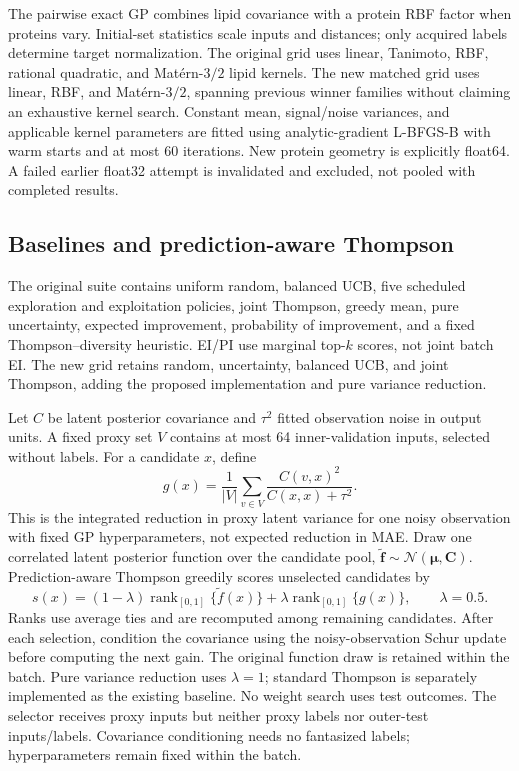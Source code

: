 \documentclass[wcp]{jmlr}
\begin{document}
The pairwise exact GP combines lipid covariance with a protein RBF factor
when proteins vary. Initial-set statistics scale inputs and distances;
only acquired labels determine target normalization. The original grid uses
linear, Tanimoto, RBF, rational quadratic, and Mat\'ern-$3/2$ lipid kernels.
The new matched grid uses linear, RBF, and Mat\'ern-$3/2$, spanning previous
winner families without claiming an exhaustive kernel search. Constant mean,
signal/noise variances, and applicable kernel parameters are fitted using
analytic-gradient L-BFGS-B with warm starts and at most 60 iterations.
New protein geometry is explicitly float64. A failed earlier float32 attempt
is invalidated and excluded, not pooled with completed results.

\subsection{Baselines and prediction-aware Thompson}
The original suite contains uniform random, balanced UCB, five scheduled
exploration and exploitation policies, joint Thompson, greedy mean, pure
uncertainty, expected improvement, probability of improvement, and a fixed
Thompson--diversity heuristic. EI/PI use marginal top-$k$ scores, not joint
batch EI. The new grid retains random, uncertainty, balanced UCB, and joint
Thompson, adding the proposed implementation and pure variance reduction.

Let $C$ be latent posterior covariance and $\tau^2$ fitted observation noise
in output units. A fixed proxy set $V$ contains at most 64 inner-validation
inputs, selected without labels. For a candidate $x$, define
\begin{equation}
g(x)=\frac{1}{|V|}\sum_{v\in V}
\frac{C(v,x)^2}{C(x,x)+\tau^2}.
\label{eq:gain}
\end{equation}
This is the integrated reduction in proxy latent variance for one noisy
observation with fixed GP hyperparameters, not expected reduction in MAE.
Draw one correlated latent posterior function over the candidate pool,
$\widetilde{\boldsymbol f}\sim\mathcal N(\boldsymbol\mu,\boldsymbol C)$.
Prediction-aware Thompson greedily scores unselected candidates by
\begin{equation}
s(x)=(1-\lambda)\operatorname{rank}_{[0,1]}\{\widetilde f(x)\}
+\lambda\operatorname{rank}_{[0,1]}\{g(x)\},\qquad\lambda=0.5.
\end{equation}
Ranks use average ties and are recomputed among remaining candidates. After
each selection, condition the covariance using the noisy-observation Schur
update before computing the next gain. The original function draw is retained
within the batch. Pure variance reduction uses $\lambda=1$; standard Thompson
is separately implemented as the existing baseline. No weight search uses
test outcomes. The selector receives proxy inputs but neither proxy labels
nor outer-test inputs/labels. Covariance conditioning needs no fantasized
labels; hyperparameters remain fixed within the batch.
\end{document}
